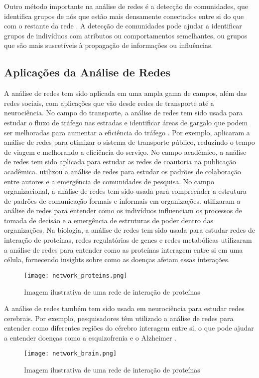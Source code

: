 Outro método importante na análise de redes é a detecção de comunidades, que identifica grupos de nós que estão mais densamente conectados entre si do que com o restante da rede \cite[]{2004_Newman}. A detecção de comunidades pode ajudar a identificar grupos de indivíduos com atributos ou comportamentos semelhantes, ou grupos que são mais suscetíveis à propagação de informações ou influências.

\subsection{Aplicações da Análise de Redes}

A análise de redes tem sido aplicada em uma ampla gama de campos, além das redes sociais, com aplicações que vão desde redes de transporte até a neurociência. No campo do transporte, a análise de redes tem sido usada para estudar o fluxo de tráfego nas estradas e identificar áreas de gargalo que podem ser melhoradas para aumentar a eficiência do tráfego \cite[]{2012_Levinson}. Por exemplo,  aplicaram a análise de redes para otimizar o sistema de transporte público, reduzindo o tempo de viagem e melhorando a eficiência do serviço. No campo acadêmico, a análise de redes tem sido aplicada para estudar as redes de coautoria na publicação acadêmica.  utilizou a análise de redes para estudar os padrões de colaboração entre autores e a emergência de comunidades de pesquisa. No campo organizacional, a análise de redes tem sido usada para compreender a estrutura de padrões de comunicação formais e informais em organizações.  utilizaram a análise de redes para entender como os indivíduos influenciam os processos de tomada de decisão e a emergência de estruturas de poder dentro das organizações. Na biologia, a análise de redes tem sido usada para estudar redes de interação de proteínas, redes regulatórias de genes e redes metabólicas  utilizaram a análise de redes para entender como as proteínas interagem entre si em uma célula, fornecendo insights sobre como as doenças afetam essas interações.
\begin{figure}[!htb]
    \caption{Imagem ilustrativa de uma rede de interação de proteínas}
    \label{fig:network_proteins}
    \centering
    \texttt{[image: network\_proteins.png]}
\end{figure}
A análise de redes também tem sido usada em neurociência para estudar redes cerebrais. Por exemplo, pesquisadores têm utilizado a análise de redes para entender como diferentes regiões do cérebro interagem entre si, o que pode ajudar a entender doenças como a esquizofrenia e o Alzheimer \cite[]{2009_Bullmore}.
\begin{figure}[!htb]
    \caption{Imagem ilustrativa de uma rede de interação de proteínas}
    \label{fig:network_brain}
    \centering
    \texttt{[image: network\_brain.png]}
\end{figure}

